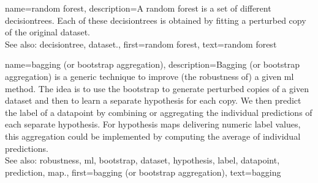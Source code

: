 {name={random forest},
	description={A random forest is a set of different \glspl{decisiontree}. 
		Each of these \glspl{decisiontree} is obtained by fitting a perturbed copy of 
		the original \gls{dataset}.
				\\
	See also: \gls{decisiontree}, \gls{dataset}.},
	first={random forest}, 
	text={random forest}
}

{name={bagging (or bootstrap aggregation)},
	description={Bagging (or bootstrap aggregation) 
		is a generic technique to improve (the \gls{robustness} of) a given \gls{ml} method. 
		The idea is to use the \gls{bootstrap} to generate perturbed copies of a given \gls{dataset} 
		and then to learn a separate \gls{hypothesis} for each copy. We then predict the 
		\gls{label} of a \gls{datapoint} by combining or aggregating the individual \glspl{prediction} 
		of each separate \gls{hypothesis}. For \gls{hypothesis} \glspl{map} delivering numeric \gls{label} 
		values, this aggregation could be implemented by computing the average of individual 
		\glspl{prediction}.
				\\
		See also: \gls{robustness}, \gls{ml}, \gls{bootstrap}, \gls{dataset}, \gls{hypothesis}, \gls{label}, \gls{datapoint}, \gls{prediction}, \gls{map}.},
	first={bagging (or bootstrap aggregation)},
	text={bagging}
}


